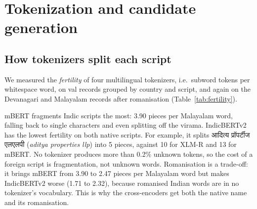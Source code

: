 \section{Tokenization and candidate generation}
\label{sec:tok}

\subsection{How tokenizers split each script}

We measured the \emph{fertility} of four multilingual tokenizers, i.e.\ subword tokens per
whitespace word, on val records grouped by country and script, and again on the Devanagari and
Malayalam records after romanisation (Table~\ref{tab:fertility}).

\begin{table}[h]
\centering\small
{}
\caption{Tokens per word on val records.}
\label{tab:fertility}
\end{table}

mBERT fragments Indic scripts the most: 3.90 pieces per Malayalam word, falling back to single characters
and even splitting off the virama. IndicBERTv2 has the lowest fertility on both native scripts. For example,
it splits {\deva आदित्य प्रॉपर्टीज एलएलपी} (\emph{aditya properties llp}) into 5 pieces, against 10 for
XLM-R and 13 for mBERT. No tokenizer produces more than 0.2\% unknown tokens, so the cost of a foreign
script is fragmentation, not unknown words. Romanisation is a trade-off: it brings mBERT from 3.90 to 2.47
pieces per Malayalam word but makes IndicBERTv2 worse (1.71 to 2.32), because romanised Indian words are
in no tokenizer's vocabulary. This is why the cross-encoders get both the native name and its romanisation.

